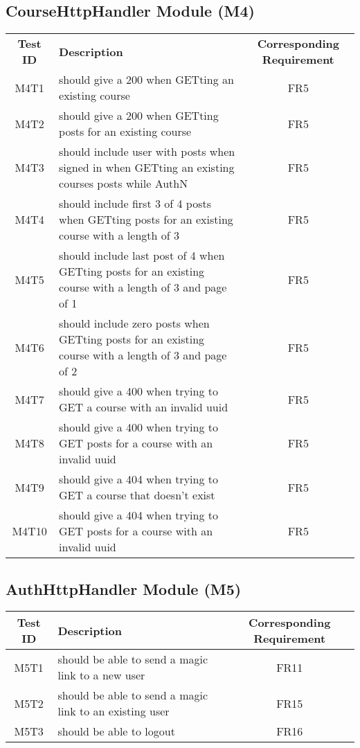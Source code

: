 \documentclass[fullpage]{article}
\begin{document}
\subsection{CourseHttpHandler Module (M4)}
\begin{table}[H]
\flushleft
\begin{tabular}{|c|p{8.5cm}|c|}
\hline
 \rowcolor{lightgray}
\textbf{Test ID} &\textbf{Description} &\textbf{Corresponding Requirement}\\
M4T1 & should give a 200 when GETting an existing course & FR5 \\
\hline
M4T2 & should give a 200 when GETting posts for an existing course & FR5 \\
\hline
M4T3 & should include user with posts when signed in when GETting an existing courses posts while AuthN & FR5 \\
\hline
M4T4 & should include first 3 of 4 posts when GETting posts for an existing course with a length of 3 & FR5 \\
\hline
M4T5 & should include last post of 4 when GETting posts for an existing course with a length of 3 and page of 1 & FR5 \\
\hline
M4T6 & should include zero posts when GETting posts for an existing course with a length of 3 and page of 2 & FR5 \\
\hline
M4T7 & should give a 400 when trying to GET a course with an invalid uuid & FR5 \\
\hline
M4T8 & should give a 400 when trying to GET posts for a course with an invalid uuid & FR5 \\
\hline
M4T9 & should give a 404 when trying to GET a course that doesn't exist & FR5 \\
\hline
M4T10 & should give a 404 when trying to GET posts for a course with an invalid uuid & FR5 \\
\hline

\end{tabular}
\end{table}


\subsection{AuthHttpHandler Module (M5)}
\begin{table}[H]
\flushleft
\begin{tabular}{|c|p{8.5cm}|c|}
\hline
 \rowcolor{lightgray}
\textbf{Test ID} &\textbf{Description} &\textbf{Corresponding Requirement}\\
\hline
M5T1 & should be able to send a magic link to a new user & FR11 \\
\hline
M5T2 & should be able to send a magic link to an existing user & FR15 \\
\hline
M5T3 & should be able to logout & FR16 \\
\hline
\end{tabular}
\end{table}
\end{document}
